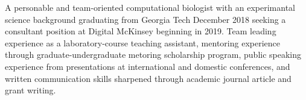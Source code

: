 

\begin{cventries}
\vspace{-4.0mm}

  \cventry
    {} %
    {} %
    {} %
    {} %
    {A personable and team-oriented computational biologist with an experimantal science background graduating from Georgia Tech December 2018 seeking a consultant position at Digital McKinsey beginning in 2019. Team leading experience as a laboratory-course teaching assistant, mentoring experience through graduate-undergraduate metoring scholarship program, public speaking experience from presentations at international and domestic conferences, and written communication skills sharpened through academic journal article and grant writing.}
    
\vspace{-4.0mm}
\end{cventries}

